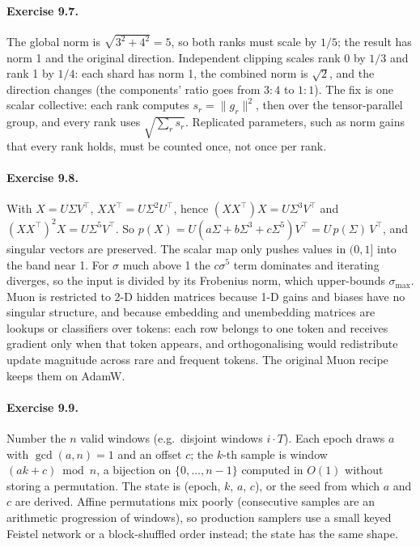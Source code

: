 \paragraph{Exercise 9.7.} The global norm is $\sqrt{3^2+4^2}=5$, so both ranks must scale by
$1/5$; the result has norm 1 and the original direction. Independent clipping scales rank 0 by
$1/3$ and rank 1 by $1/4$: each shard has norm 1, the combined norm is $\sqrt2$, and the
direction changes (the components' ratio goes from $3:4$ to $1:1$). The fix is one scalar
collective: each rank computes $s_r=\|g_r\|^2$, then  over the
tensor-parallel group, and every rank uses $\sqrt{\sum_r s_r}$. Replicated parameters, such as
norm gains that every rank holds, must be counted once, not once per rank.

\paragraph{Exercise 9.8.} With $X=U\Sigma V^\top$, $XX^\top=U\Sigma^2U^\top$, hence
$(XX^\top)X=U\Sigma^3V^\top$ and $(XX^\top)^2X=U\Sigma^5V^\top$. So
$p(X)=U(a\Sigma+b\Sigma^3+c\Sigma^5)V^\top=U\,p(\Sigma)\,V^\top$, and singular vectors are
preserved. The scalar map only pushes values in $(0,1]$ into the band near 1. For $\sigma$ much
above 1 the $c\sigma^5$ term dominates and iterating diverges, so the input is divided by its
Frobenius norm, which upper-bounds $\sigma_{\max}$. Muon is restricted to 2-D hidden matrices
because 1-D gains and biases have no singular structure, and because embedding and unembedding
matrices are lookups or classifiers over tokens: each row belongs to one token and receives
gradient only when that token appears, and orthogonalising would redistribute update magnitude
across rare and frequent tokens. The original Muon recipe keeps them on AdamW.

\paragraph{Exercise 9.9.} Number the $n$ valid windows (e.g.\ disjoint windows $i\cdot T$).
Each epoch draws $a$ with $\gcd(a,n)=1$ and an offset $c$; the $k$-th sample is window
$(a k + c)\bmod n$, a bijection on $\{0,\dots,n-1\}$ computed in $O(1)$ without storing a
permutation. The state is (epoch, $k$, $a$, $c$), or the seed from which $a$ and $c$ are derived.
Affine permutations mix poorly (consecutive samples are an arithmetic progression of windows), so
production samplers use a small keyed Feistel network or a block-shuffled order instead; the
state has the same shape.

